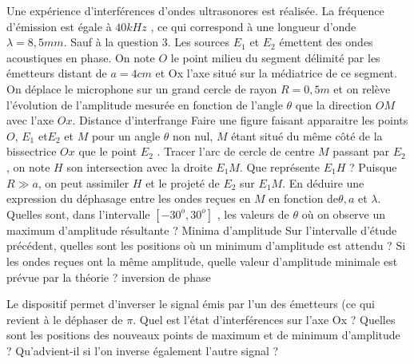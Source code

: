 \begin{Exercise}[title=Intérférences ultrasonores]
  Une expérience d’interférences d’ondes ultrasonores est réalisée. La fréquence d’émission
est égale à $40 kHz$ , ce qui correspond à une longueur d’onde$\lambda = 8,5 mm$. Sauf à la question
3. Les sources $E_1$ et $E_2$ émettent des ondes acoustiques en phase. On note $O$ le point milieu du segment délimité par les émetteurs distant de $a = 4 cm$ et Ox l’axe situé sur la médiatrice de ce segment. On déplace le microphone sur un grand cercle de
rayon $R = 0,5 m$ et on relève l’évolution de l’amplitude mesurée en fonction de l’angle $\theta$ que la direction $OM$ avec l’axe $Ox$.
\Question Distance d'interfrange
\subQuestion Faire une figure faisant apparaitre les points $O$, $E_1$ et$ E_2$ et $M$ pour un
angle $\theta$ non nul, $M$ étant situé du même côté de la bissectrice $Ox$ que le point $E_2$ .
\subQuestion Tracer l’arc de cercle de centre $M$ passant par $E_2$ , on note $H$ son
intersection avec la droite $E_1 M$. Que représente $E_1 H$ ?
\subQuestion Puisque $R \gg a$, on peut assimiler $H$ et le projeté de $E_2$ sur $E_1 M$. En
déduire une expression du déphasage entre les ondes reçues en $M$ en
fonction de$\theta, a$ et $\lambda$.
\subQuestion Quelles sont, dans l’intervalle $[-30^o, 30^o]$ , les valeurs de $\theta$ où on
observe un maximum d’amplitude résultante ?
\Question Minima d'amplitude
\subQuestion Sur l’intervalle d’étude précédent, quelles sont les positions où un
minimum d’amplitude est attendu ?
\subQuestion Si les ondes reçues ont la même amplitude, quelle valeur d’amplitude
minimale est prévue par la théorie ?
\Question inversion de phase

Le dispositif permet d’inverser le signal émis par l’un des émetteurs (ce qui
revient à le déphaser de $\pi$.
\subQuestion Quel est l’état d’interférences sur l’axe Ox ?
\subQuestion Quelles sont les positions des nouveaux points de maximum et de
minimum d’amplitude ?
\subQuestion Qu’advient-il si l’on inverse également l’autre signal ?
\end{Exercise}
